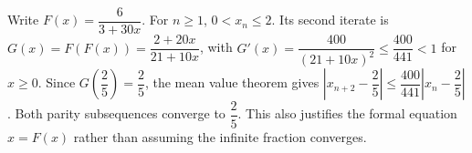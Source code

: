Write $F(x)=\dfrac{6}{3+30x}$. For $n\ge1$, $0<x_n\le2$. Its second iterate is $G(x)=F(F(x))=\dfrac{2+20x}{21+10x}$, with $G\prime(x)=\dfrac{400}{(21+10x)^2}\le\dfrac{400}{441}<1$ for $x\ge0$. Since $G(\dfrac{2}{5})=\dfrac{2}{5}$, the mean value theorem gives $|x_{n+2}-\dfrac{2}{5}|\le\dfrac{400}{441}|x_n-\dfrac{2}{5}|$. Both parity subsequences converge to $\boxed{\dfrac{2}{5}}$. This also justifies the formal equation $x=F(x)$ rather than assuming the infinite fraction converges.
